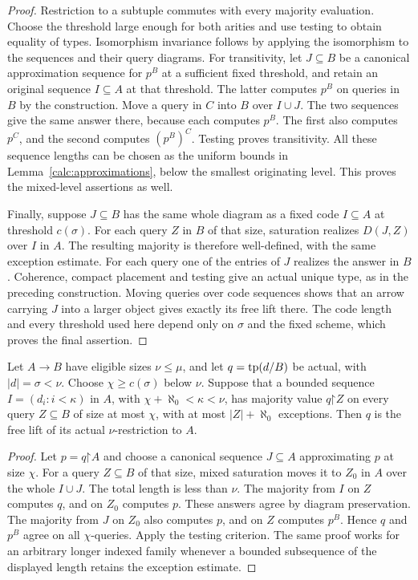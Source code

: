 \begin{proof}
Restriction to a subtuple commutes with every majority evaluation.
Choose the threshold large enough for both arities and use testing to
obtain equality of types.  Isomorphism invariance follows by applying
the isomorphism to the sequences and their query diagrams.
For transitivity, let $J\subseteq B$ be a canonical approximation
sequence for $p^B$ at a sufficient fixed threshold, and retain an
original sequence $I\subseteq A$ at that threshold.  The latter
computes $p^B$ on queries in $B$ by the construction.  Move a query in
$C$ into $B$ over $I\cup J$.  The two sequences give the same answer
there, because each computes $p^B$.  The first also computes $p^C$,
and the second computes $(p^B)^C$.  Testing proves transitivity.
All these sequence lengths can be chosen as the uniform bounds in
Lemma~\ref{calc:approximations}, below the smallest originating level.
This proves the mixed-level assertions as well.

Finally, suppose $J\subseteq B$ has the same whole diagram as a fixed
code $I\subseteq A$ at threshold $c(\sigma)$.  For each query $Z$ in
$B$ of that size, saturation realizes $D(J,Z)$ over $I$ in $A$.
The resulting majority is therefore well-defined, with the same
exception estimate.  For each query one of the entries of $J$ realizes
the answer in $B$.  Coherence, compact placement and testing give an
actual unique type, as in the preceding construction.  Moving queries
over code sequences shows that an arrow carrying $J$ into a larger
object gives exactly its free lift there.  The code length and every
threshold used here depend only on $\sigma$ and the fixed scheme,
which proves the final assertion.
\end{proof}

\begin{lemma}
\label{calc:average-descent}
Let $A\to B$ have eligible sizes $\nu\le\mu$, and let $q=\operatorname{tp}(d/B)$
be actual, with $|d|=\sigma<\nu$.  Choose
$\chi\ge c(\sigma)$ below $\nu$.  Suppose that a bounded sequence
$I=(d_i:i<\kappa)$ in $A$, with $\chi+\aleph_0<\kappa<\nu$, has
majority value $q\mathord\upharpoonright Z$ on every query
$Z\subseteq B$ of size at most $\chi$, with at most
$|Z|+\aleph_0$ exceptions.  Then $q$ is the free lift of its actual
$\nu$-restriction to $A$.
\end{lemma}

\begin{proof}
Let $p=q\mathord\upharpoonright A$ and choose a canonical sequence
$J\subseteq A$ approximating $p$ at size $\chi$.  For a query
$Z\subseteq B$ of that size, mixed saturation moves it to $Z_0$ in
$A$ over the whole $I\cup J$.  The total length is less than $\nu$.
The majority from $I$ on $Z$ computes $q$, and on $Z_0$ computes $p$.
These answers agree by diagram preservation.  The majority from $J$
on $Z_0$ also computes $p$, and on $Z$ computes $p^B$.
Hence $q$ and $p^B$ agree on all $\chi$-queries.  Apply the testing
criterion.  The same proof works for an arbitrary longer indexed
family whenever a bounded subsequence of the displayed length retains
the exception estimate.
\end{proof}


